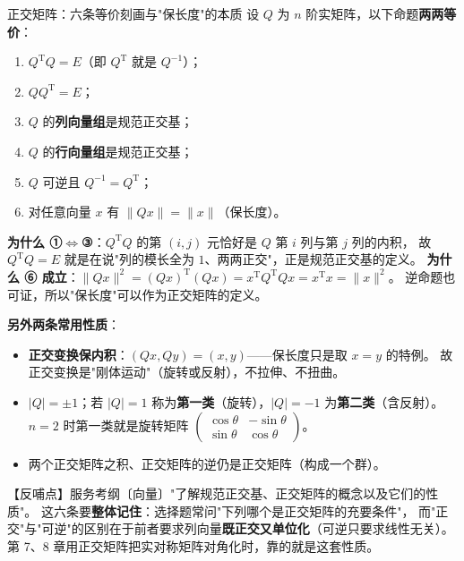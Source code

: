 \begin{fdeep}{正交矩阵：六条等价刻画与"保长度"的本质}
设 $Q$ 为 $n$ 阶实矩阵，以下命题\textbf{两两等价}：
\begin{enumerate}[leftmargin=2.2em,itemsep=0.22em]
\item $Q^{\mathrm T}Q=E$（即 $Q^{\mathrm T}$ 就是 $Q^{-1}$）；
\item $QQ^{\mathrm T}=E$；
\item $Q$ 的\textbf{列向量组}是规范正交基；
\item $Q$ 的\textbf{行向量组}是规范正交基；
\item $Q$ 可逆且 $Q^{-1}=Q^{\mathrm T}$；
\item 对任意向量 $x$ 有 $\lVert Qx\rVert=\lVert x\rVert$（保长度）。
\end{enumerate}
\textbf{为什么 ①$\iff$③}：$Q^{\mathrm T}Q$ 的第 $(i,j)$ 元恰好是 $Q$ 第 $i$ 列与第 $j$ 列的内积，
故 $Q^{\mathrm T}Q=E$ 就是在说"列的模长全为 $1$、两两正交"，正是规范正交基的定义。
\textbf{为什么 ⑥ 成立}：$\lVert Qx\rVert^{2}=(Qx)^{\mathrm T}(Qx)=x^{\mathrm T}Q^{\mathrm T}Qx=x^{\mathrm T}x=\lVert x\rVert^{2}$。
逆命题也可证，所以"保长度"可以作为正交矩阵的定义。

\textbf{另外两条常用性质}：
\begin{itemize}[leftmargin=2.2em,itemsep=0.22em]
\item \textbf{正交变换保内积}：$(Qx,Qy)=(x,y)$——保长度只是取 $x=y$ 的特例。
      故正交变换是"刚体运动"（旋转或反射），不拉伸、不扭曲。
\item $\lvert Q\rvert=\pm1$；若 $\lvert Q\rvert=1$ 称为\textbf{第一类}（旋转），$\lvert Q\rvert=-1$ 为\textbf{第二类}（含反射）。
      $n=2$ 时第一类就是旋转矩阵 $\begin{pmatrix}\cos\theta&-\sin\theta\\ \sin\theta&\cos\theta\end{pmatrix}$。
\item 两个正交矩阵之积、正交矩阵的逆仍是正交矩阵（构成一个群）。
\end{itemize}
【反哺点】服务考纲〔向量〕"了解规范正交基、正交矩阵的概念以及它们的性质"。
这六条要\textbf{整体记住}：选择题常问"下列哪个是正交矩阵的充要条件"，
而"正交"与"可逆"的区别在于前者要求列向量\textbf{既正交又单位化}（可逆只要求线性无关）。
第 7、8 章用正交矩阵把实对称矩阵对角化时，靠的就是这套性质。
\end{fdeep}
